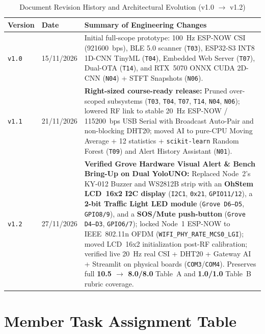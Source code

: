 \documentclass{hcmut-report}
\renewcommand{\arraystretch}{1.24}
\begin{document}
\begin{table}[H]
\centering
\caption{Document Revision History and Architectural Evolution (v1.0 $\rightarrow$ v1.2)}
\label{tab:revision_history}
\footnotesize
\renewcommand{\arraystretch}{1.10}
\begin{tabularx}{\textwidth}{|C{1.45cm}|C{2.15cm}|Y|}
\hline
\textbf{Version} & \textbf{Date} & \textbf{Summary of Engineering Changes} \\
\hline
\texttt{v1.0} & 15/11/2026 & Initial full-scope prototype: 100~Hz ESP-NOW CSI (921600~bps), BLE 5.0 scanner (\texttt{T03}), ESP32-S3 INT8 1D-CNN TinyML (\texttt{T04}), Embedded Web Server (\texttt{T07}), Dual-OTA (\texttt{T14}), and RTX~5070 ONNX CUDA 2D-CNN (\texttt{N04}) + STFT Snapshots (\texttt{N06}). \\
\hline
\texttt{v1.1} & 21/11/2026 & \textbf{Right-sized course-ready release:} Pruned over-scoped subsystems (\texttt{T03}, \texttt{T04}, \texttt{T07}, \texttt{T14}, \texttt{N04}, \texttt{N06}); lowered RF link to stable 20~Hz ESP-NOW / 115200~bps USB Serial with Broadcast Auto-Pair and non-blocking DHT20; moved AI to pure-CPU Moving Average + 12 statistics + \texttt{scikit-learn} Random Forest (\texttt{T09}) and Alert History Assistant (\texttt{N01}). \\
\hline
\texttt{v1.2} & 27/11/2026 & \textbf{Verified Grove Hardware Visual Alert \& Bench Bring-Up on Dual YoloUNO:} Replaced Node~2's KY-012 Buzzer and WS2812B strip with an \textbf{OhStem LCD~16x2 I2C display} (\texttt{I2C1}, \texttt{0x21}, \texttt{GPIO11/12}), a \textbf{2-bit Traffic Light LED module} (\texttt{Grove D6--D5}, \texttt{GPIO8/9}), and a \textbf{SOS/Mute push-button} (\texttt{Grove D4--D3}, \texttt{GPIO6/7}); locked Node~1 ESP-NOW to IEEE~802.11n OFDM (\texttt{WIFI\_PHY\_RATE\_MCS0\_LGI}); moved LCD~16x2 initialization post-RF calibration; verified live 20~Hz real CSI + DHT20 + Gateway AI + Streamlit on physical boards (\texttt{COM3}/\texttt{COM4}). Preserves full \textbf{10.5 $\rightarrow$ 8.0/8.0} Table~A and \textbf{1.0/1.0} Table~B rubric coverage. \\
\hline
\end{tabularx}
\end{table}

\section*{Member Task Assignment Table}
\end{document}

